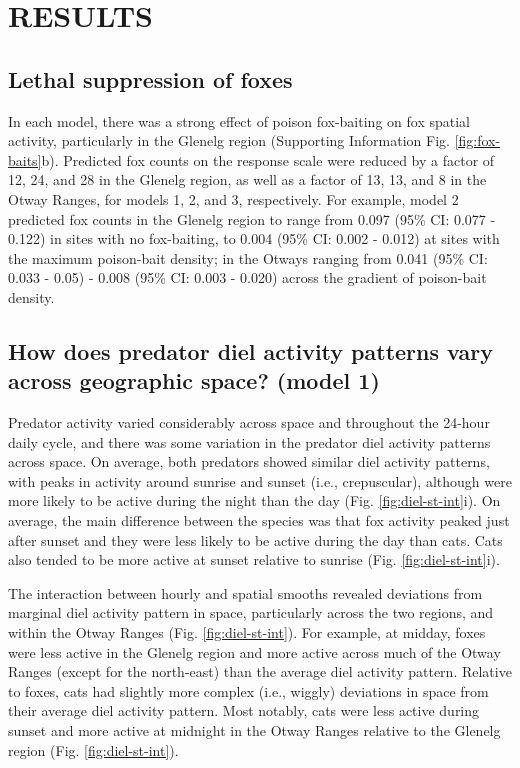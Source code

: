 \documentclass[preprint, 3p, authoryear]{elsarticle} %
\begin{document}
\newpage

\hypertarget{results}{%
\section{RESULTS}\label{results}}

\hypertarget{lethal-suppression-of-foxes}{%
\subsection{Lethal suppression of foxes}\label{lethal-suppression-of-foxes}}

In each model, there was a strong effect of poison fox-baiting on fox spatial activity, particularly in the Glenelg region (Supporting Information Fig. \ref{fig:fox-baits}b). Predicted fox counts on the response scale were reduced by a factor of 12, 24, and 28 in the Glenelg region, as well as a factor of 13, 13, and 8 in the Otway Ranges, for models 1, 2, and 3, respectively. For example, model 2 predicted fox counts in the Glenelg region to range from 0.097 (95\% CI: 0.077 - 0.122) in sites with no fox-baiting, to 0.004 (95\% CI: 0.002 - 0.012) at sites with the maximum poison-bait density; in the Otways ranging from 0.041 (95\% CI: 0.033 - 0.05) - 0.008 (95\% CI: 0.003 - 0.020) across the gradient of poison-bait density.

\hypertarget{how-does-predator-diel-activity-patterns-vary-across-geographic-space-model-1-1}{%
\subsection{How does predator diel activity patterns vary across geographic space? (model 1)}\label{how-does-predator-diel-activity-patterns-vary-across-geographic-space-model-1-1}}

Predator activity varied considerably across space and throughout the 24-hour daily cycle, and there was some variation in the predator diel activity patterns across space. On average, both predators showed similar diel activity patterns, with peaks in activity around sunrise and sunset (i.e., crepuscular), although were more likely to be active during the night than the day (Fig. \ref{fig:diel-st-int}i). On average, the main difference between the species was that fox activity peaked just after sunset and they were less likely to be active during the day than cats. Cats also tended to be more active at sunset relative to sunrise (Fig. \ref{fig:diel-st-int}i).

The interaction between hourly and spatial smooths revealed deviations from marginal diel activity pattern in space, particularly across the two regions, and within the Otway Ranges (Fig. \ref{fig:diel-st-int}). For example, at midday, foxes were less active in the Glenelg region and more active across much of the Otway Ranges (except for the north-east) than the average diel activity pattern. Relative to foxes, cats had slightly more complex (i.e., wiggly) deviations in space from their average diel activity pattern. Most notably, cats were less active during sunset and more active at midnight in the Otway Ranges relative to the Glenelg region (Fig. \ref{fig:diel-st-int}).
\end{document}
